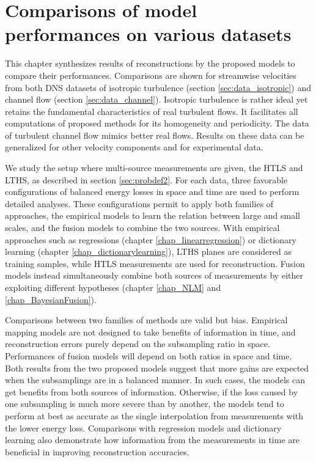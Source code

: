\chapter{Comparisons of model performances on various datasets} 
\label{chap_comparisons} 

This chapter synthesizes results of reconstructions by the proposed models to compare their performances. Comparisons are shown for streamwise velocities from both DNS datasets of isotropic turbulence (section \ref{sec:data_isotropic}) and channel flow (section \ref{sec:data_channel}). Isotropic turbulence is rather ideal yet retains the fundamental characteristics of real turbulent flows. It facilitates all computations of proposed methods for its homogeneity and periodicity. The data of turbulent channel flow mimics better real flows. Results on these data can be generalized for other velocity components and for experimental data. 

We study the setup where multi-source measurements are given, the HTLS and LTHS, as described in section \ref{sec:probdef2}. For each data, three favorable configurations of balanced energy losses in space and time are used to perform detailed analyses. These configurations permit to apply both families of approaches, the empirical models to learn the relation between large and small scales, and the fusion models to combine the two sources. With empirical approaches such as regressions (chapter \ref{chap_linearregression}) or dictionary learning (chapter \ref{chap_dictionarylearning}), LTHS planes are considered as training samples, while HTLS measurements are used for reconstruction. Fusion models instead simultaneously combine both sources of measurements by either exploiting different hypotheses (chapter \ref{chap_NLM} and \ref{chap_BayesianFusion}). 

Comparisons between two families of methods are valid but bias. Empirical mapping models are not designed to take benefits of information in time, and reconstruction errors purely depend on the subsampling ratio in space. Performances of fusion models will depend on both ratios in space and time. Both results from the two proposed models suggest that more gains are expected when the subsamplings are in a balanced manner. In such cases, the models can get benefits from both sources of information. Otherwise, if the loss caused by one subsampling is much more severe than by another, the models tend to perform at best as accurate as the single interpolation from measurements with the lower energy loss. Comparisons with regression models and dictionary learning also demonstrate how information from the measurements in time are beneficial in improving reconstruction accuracies.

